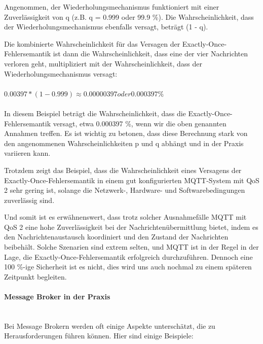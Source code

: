 \documentclass[../vs-script-first-v01.tex]{subfiles}
\begin{document}
Angenommen, der Wiederholungsmechanismus funktioniert mit einer Zuverlässigkeit von q (z.B. q = 0.999 oder 99.9 \%). Die Wahrscheinlichkeit, dass der Wiederholungsmechanismus ebenfalls versagt, beträgt (1 - q).

Die kombinierte Wahrscheinlichkeit für das Versagen der Exactly-Once-Fehlersemantik ist dann die Wahrscheinlichkeit, dass eine der vier Nachrichten verloren geht, multipliziert mit der Wahrscheinlichkeit, dass der Wiederholungsmechanismus versagt:
\\\\
$0.00397 * (1 - 0.999) \approx 0.00000397 oder 0.000397 \%$
\\\\
In diesem Beispiel beträgt die Wahrscheinlichkeit, dass die Exactly-Once-Fehlersemantik versagt, etwa 0.000397 \%, wenn wir die oben genannten Annahmen treffen. Es ist wichtig zu betonen, dass diese Berechnung stark von den angenommenen Wahrscheinlichkeiten p und q abhängt und in der Praxis variieren kann.

Trotzdem zeigt das Beispiel, dass die Wahrscheinlichkeit eines Versagens der Exactly-Once-Fehlersemantik in einem gut konfigurierten MQTT-System mit QoS 2 sehr gering ist, solange die Netzwerk-, Hardware- und Softwarebedingungen zuverlässig sind.

Und somit ist es erwähnenswert, dass trotz solcher Ausnahmefälle MQTT mit QoS 2 eine hohe Zuverlässigkeit bei der Nachrichtenübermittlung bietet, indem es den Nachrichtenaustausch koordiniert und den Zustand der Nachrichten beibehält. Solche Szenarien sind extrem selten, und MQTT ist in der Regel in der Lage, die Exactly-Once-Fehlersemantik erfolgreich durchzuführen. Dennoch eine 100 \%-ige Sicherheit ist es nicht, dies wird uns auch nochmal zu einem späteren Zeitpunkt begleiten. 

\paragraph{Message Broker in der Praxis\\\\}

Bei Message Brokern werden oft einige Aspekte unterschätzt, die zu Herausforderungen führen können. Hier sind einige Beispiele:
\end{document}
